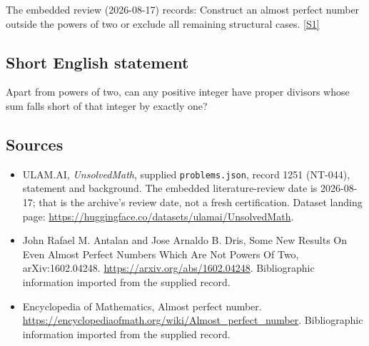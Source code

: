 \documentclass[11pt,a4paper]{article}
\newcommand{\sref}[2]{\hyperlink{source:#1:#2}{[S#2]}}
\begin{document}
The embedded review (2026-08-17) records: Construct an almost perfect number outside the powers of two or exclude all remaining structural cases. \sref{1251}{1}

\subsection{Short English statement}

Apart from powers of two, can any positive integer have proper divisors whose sum falls short of that integer by exactly one?

\subsection{Sources}

{\small

\begin{itemize}

\item[\hypertarget{source:1251:1}{S1}] ULAM.AI, \emph{UnsolvedMath}, supplied \texttt{problems.json}, record 1251 (NT-044), statement and background. The embedded literature-review date is 2026-08-17; that is the archive’s review date, not a fresh certification. Dataset landing page: \url{https://huggingface.co/datasets/ulamai/UnsolvedMath}.

\item[\hypertarget{source:1251:2}{S2}] John Rafael M. Antalan and Jose Arnaldo B. Dris, Some New Results On Even Almost Perfect Numbers Which Are Not Powers Of Two, arXiv:1602.04248. \url{https://arxiv.org/abs/1602.04248}. Bibliographic information imported from the supplied record.

\item[\hypertarget{source:1251:3}{S3}] Encyclopedia of Mathematics, Almost perfect number. \url{https://encyclopediaofmath.org/wiki/Almost_perfect_number}. Bibliographic information imported from the supplied record.

\end{itemize}

}

\label{end:1251}
\end{document}
